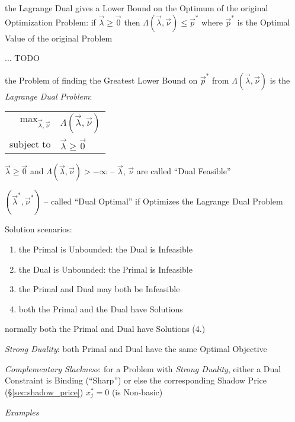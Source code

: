 the Lagrange Dual gives a Lower Bound on the Optimum of the original
Optimization Problem: if $\vec{\lambda} \geq \vec{0}$ then
$\Lambda(\vec{\lambda}, \vec{\nu}) \leq \vec{p}^*$ where $\vec{p}^*$ is the
Optimal Value of the original Problem

... TODO

the Problem of finding the Greatest Lower Bound on $\vec{p}^*$ from
$\Lambda(\vec{\lambda},\vec{\nu})$ is the \emph{Lagrange Dual Problem}:
\begin{tabular}{r l}
  $\mathrm{max}_{\vec{\lambda},\vec{\nu}}$ &
    $\Lambda(\vec{\lambda},\vec{\nu})$ \\
  subject to & $\vec{\lambda} \geq \vec{0}$ \\
\end{tabular}

$\vec{\lambda} \geq \vec{0}$ and $\Lambda(\vec{\lambda},\vec{\nu}) > -\infty$
  -- $\vec{\lambda}$, $\vec{\nu}$ are called ``Dual Feasible''

$(\vec{\lambda}^*, \vec{\nu}^*)$ -- called ``Dual Optimal'' if Optimizes the
Lagrange Dual Problem


Solution scenarios:
\begin{enumerate}
  \item the Primal is Unbounded: the Dual is Infeasible
  \item the Dual is Unbounded: the Primal is Infeasible
  \item the Primal and Dual may both be Infeasible
  \item both the Primal and the Dual have Solutions
\end{enumerate}
normally both the Primal and Dual have Solutions (4.)


\emph{Strong Duality}: both Primal and Dual have the same Optimal Objective


\emph{Complementary Slackness}: for a Problem with \emph{Strong Duality},
either a Dual Constraint is Binding (``Sharp'') or else the corresponding
Shadow Price (\S\ref{sec:shadow_price}) $x_j^* = 0$ (is Non-basic)


\emph{Examples}

